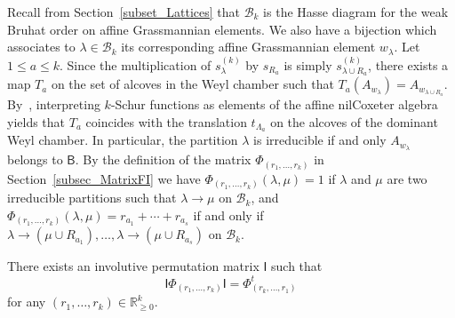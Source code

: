 \documentclass[ALCO,ThmDefs,Unicode,epreuves]{cedram}
\begin{document}
Recall from Section~\ref{subset_Lattices} that $\mathcal{B}_{k}$ is the Hasse
diagram for the weak Bruhat order on affine Grassmannian elements. We also
have a bijection which associates to $\lambda\in\mathcal{B}_{k}$ its
corresponding affine Grassmannian element $w_{\lambda}$. Let $1\leq a\leq k$.
Since the multiplication of $s_{\lambda}^{(k)}$ by $s_{R_{a}}$ is simply
$s_{\lambda\cup R_{a}}^{(k)}$, there exists a map $T_{a}$ on the set of
alcoves in the Weyl chamber such that $T_{a}(A_{w_{\lambda}})=A_{w_{\lambda
\cup R_{a}}}$. By~\cite{BBTZ}, interpreting $k$-Schur functions as elements of
the affine nilCoxeter algebra yields that $T_{a}$ coincides with the
translation $t_{\Lambda_{a}}$ on the alcoves of the dominant Weyl chamber. In
particular, the partition $\lambda$ is irreducible if and only $A_{w_{\lambda
}}$ belongs to $\mathsf{B}$. By the definition of the matrix $\Phi
_{(r_{1},\ldots,r_{k})}$ in Section~\ref{subsec_MatrixFI} we have
$\Phi_{(r_{1},\ldots,r_{k})}(\lambda,\mu)=1$ if $\lambda$ and $\mu$ are two
irreducible partitions such that $\lambda\rightarrow\mu$ on $\mathcal{B}_{k}$,
and $\Phi_{(r_{1},\ldots,r_{k})}(\lambda,\mu)=r_{a_{1}}+\cdots+r_{a_{s}}$ if
and only if $\lambda\rightarrow(\mu\cup R_{a_{1}}),\ldots,\lambda
\rightarrow(\mu\cup R_{a_{s}})$ on $\mathcal{B}_{k}$.

\begin{prop}
\label{PhiSymmetryGrass} There exists an involutive permutation matrix
$\mathsf{I}$ such that
\[
\mathsf{I}\Phi_{(r_{1},\ldots,r_{k})}\mathsf{I}=\Phi_{(r_{k},\ldots,r_{1}%
)}^{t}%
\]
for any $(r_{1},\dots,r_{k})\in\mathbb{R}_{\geq0}^{k}$.
\end{prop}
\end{document}
